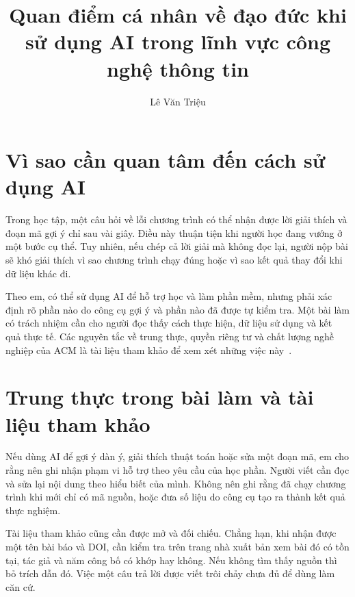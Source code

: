 \documentclass[pdflatex,sn-mathphys-num]{sn-jnl}
\begin{document}
\title[Đạo đức khi sử dụng AI trong CNTT]{Quan điểm cá nhân về đạo đức khi sử dụng AI trong lĩnh vực công nghệ thông tin}
\author*{Lê Văn Triệu}
\maketitle

\section{Vì sao cần quan tâm đến cách sử dụng AI}
Trong học tập, một câu hỏi về lỗi chương trình có thể nhận được lời giải thích và đoạn mã gợi ý chỉ sau vài giây. Điều này thuận tiện khi người học đang vướng ở một bước cụ thể. Tuy nhiên, nếu chép cả lời giải mà không đọc lại, người nộp bài sẽ khó giải thích vì sao chương trình chạy đúng hoặc vì sao kết quả thay đổi khi dữ liệu khác đi.

Theo em, có thể sử dụng AI để hỗ trợ học và làm phần mềm, nhưng phải xác định rõ phần nào do công cụ gợi ý và phần nào đã được tự kiểm tra. Một bài làm có trách nhiệm cần cho người đọc thấy cách thực hiện, dữ liệu sử dụng và kết quả thực tế. Các nguyên tắc về trung thực, quyền riêng tư và chất lượng nghề nghiệp của ACM là tài liệu tham khảo để xem xét những việc này~\cite{acm2018}.

\section{Trung thực trong bài làm và tài liệu tham khảo}
Nếu dùng AI để gợi ý dàn ý, giải thích thuật toán hoặc sửa một đoạn mã, em cho rằng nên ghi nhận phạm vi hỗ trợ theo yêu cầu của học phần. Người viết cần đọc và sửa lại nội dung theo hiểu biết của mình. Không nên ghi rằng đã chạy chương trình khi mới chỉ có mã nguồn, hoặc đưa số liệu do công cụ tạo ra thành kết quả thực nghiệm.

Tài liệu tham khảo cũng cần được mở và đối chiếu. Chẳng hạn, khi nhận được một tên bài báo và DOI, cần kiểm tra trên trang nhà xuất bản xem bài đó có tồn tại, tác giả và năm công bố có khớp hay không. Nếu không tìm thấy nguồn thì bỏ trích dẫn đó. Việc một câu trả lời được viết trôi chảy chưa đủ để dùng làm căn cứ.
\end{document}
